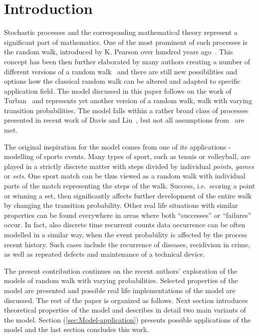 \documentclass[runningheads]{CMSIM}
\begin{document}
    \section{Introduction}\label{sec:introduction}

    Stochastic processes and the corresponding mathematical theory represent
    a significant part of mathematics.
    One of the most prominent of such
    processes is the random walk, introduced by K. Pearson over hundred
    years ago~\cite{pearson1905problem}.
    This concept has been then further
    elaborated by many authors creating a number of different versions
    of a random walk~\cite{spitzer2013principles} and there are still
    new possibilities and options how the classical random walk can be
    altered and adapted to specific application field.
    The model discussed
    in this paper follows on the work of Turban~\cite{turban2010random}
    and represents yet another version of a random walk, walk with varying
    transition probabilities.
    The model falls within a rather broad class
    of processes presented in recent work of Davis and Liu~\cite{davis2012theory}, but not all assumptions from~\cite{davis2012theory} are met.

    The original inspiration for the model comes from one of its applications
    - modelling of sports events.
    Many types of sport, such as tennis
    or volleyball, are played in a strictly discrete matter with steps
    divided by individual \emph{points},\emph{ games }or \emph{sets}.
    One sport match can be thus viewed as a random walk with individual
    parts of the match representing the steps of the walk.
    Success, i.e.\ scoring a point or winning a set, then significantly affects further
    development of the entire walk by changing the transition probability.
    Other real life situations with similar properties can be found everywhere
    in areas where both ``successes'' or ``failures'' occur.
    In fact,
    also discrete time recurrent counts data occurrence can be often modelled
    in a similar way, when the event probability is affected by the process
    recent history.
    Such cases include the recurrence of diseases, recidivism
    in crime, as well as repeated defects and maintenance of a technical
    device.

    The present contribution continues on the recent authors' exploration
    of the models of random walk with varying probabilities.
    Selected
    properties of the model are presented and possible real life implementations
    of the model are discussed.
    The rest of the paper is organized as
    follows.
    Next section introduces theoretical properties of the model
    and describes in detail two main variants of the model.
    Section (\ref{sec:Model-application})
    presents possible applications of the model and the last section concludes
    this work.
\end{document}
